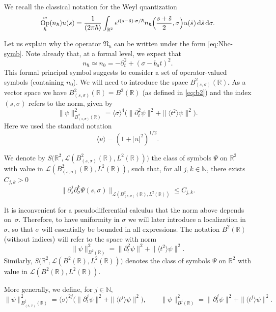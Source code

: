 \documentclass[10pt]{amsart}
\newcommand{\rd}{\,\mathrm{d}}
\DeclareMathOperator{\Op}{Op}
\theoremstyle{plain}
\theoremstyle{definition}
\newcommand{\R}{\mathbb{R}}
\begin{document}
We recall the classical notation for the Weyl quantization
\begin{equation}\label{eq:Nhc-symb}
\Op^w_\hbar (n_{\hbar}) u (s)=\frac{1}{(2\pi\hbar)} \int_{\mathbb R^2} e^{i(s-\tilde s)\cdot \sigma/\hbar} n_{\hbar} \Bigl(\frac{s+\tilde s}{2}, \sigma\Bigr)u(\tilde s) \rd \tilde s \rd \sigma.
\end{equation}

Let us explain why the operator $\mathfrak{N}_\hbar$ can be written under the form \eqref{eq:Nhc-symb}. Note already that, at a formal level, we expect that
\[
n_{\hbar}\simeq n_0=-\partial^2_t+(\sigma-b_a t)^2.
\]
This formal principal symbol suggests to consider a set of operator-valued symbols (containing $n_0$).
We will need to introduce the space $B_{(s,\sigma)}^2(\R)$. As a vector space we have $B_{(s,\sigma)}^2(\R) = B^2(\R)$ (as defined in \eqref{eq:b2}) and the index $(s,\sigma)$ refers to the norm, given by
\[
\|\psi\|^2_{B_{(s,\sigma)}^2(\R)}=\langle \sigma\rangle^4 \bigl(\|\partial^2_t\psi\|^2+\|\langle t^2\rangle\psi\|^2\bigr).
\]
Here we used the standard notation
\begin{equation}\label{eq:<u>}
\langle u\rangle=(1+|u|^2)^{1/2}.
\end{equation}

We denote by $S\bigl(\R^2,\mathscr{L}(B_{(s,\sigma)}^2(\R),L^2(\R))\bigr)$ the class of symbols $\Psi$ on $\mathbb R^2$
with value in $\mathscr{L}(B_{(s,\sigma)}^2(\R),L^2(\R))$, such that, for all $j,k \in \mathbb N$, there exists $C_{j,k} >0$
\[
\| \partial_s^j\partial_\sigma^k \Psi (s,\sigma)\|_{\mathscr{L} (B_{(s,\sigma)}^2(\mathbb R),L^2(\mathbb R))}\leq C_{j,k}.
\]

It is inconvenient for a pseudodifferential calculus that the norm above depends on~$\sigma$. Therefore, to have uniformity in $\sigma$ we will later introduce a localization in $\sigma$, so that $\sigma$ will essentially be bounded in all expressions.
The notation $B^2(\R)$ (without indices) will refer to the space with norm
\[
\|\psi\|^2_{B^2(\R)}=\|\partial^2_t\psi\|^2+\|\langle t^2\rangle\psi\|^2 .
\]
Similarly,
$S\bigl(\R^2,\mathscr{L}(B^2(\R),L^2(\R))\bigr)$ denotes the class of symbols $\Psi$ on $\mathbb R^2$
with value in $\mathscr{L}(B^2(\R),L^2(\R))$.

More generally, we define, for $j\in {\mathbb N}$,
\begin{equation}\label{eq:bj}
\|\psi\|^2_{B_{(s,\sigma)}^j(\R)}=\langle \sigma\rangle^{2j} \bigl(\|\partial^j_t\psi\|^2+\|\langle t^j\rangle\psi\|^2\bigr), \qquad
\|\psi\|^2_{B^j(\R)}= \|\partial^j_t\psi\|^2+\|\langle t^j\rangle\psi\|^2.
\end{equation}
\end{document}
